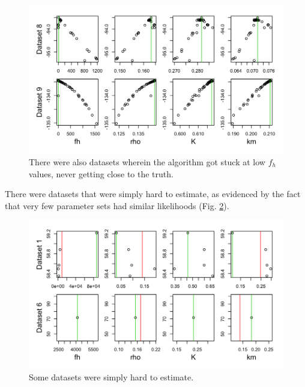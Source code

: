 \documentclass[12pt,reqno,final,pdftex]{amsart}\usepackage[]{graphicx}\usepackage[]{color}
\newenvironment{knitrout}{}{} %
\theoremstyle{plain}
\numberwithin{equation}{part}
\begin{document}
\begin{knitrout}\scriptsize
{}\color{fgcolor}\begin{figure}

\includegraphics[width=\linewidth]{figure/lik-against-ests-4-1} \hfill{}

\caption[There were also datasets wherein the algorithm got stuck at low ]{There were also datasets wherein the algorithm got stuck at low $f_h$ values, never getting close to the truth.}\label{fig:lik-against-ests-4}
\end{figure}


\end{knitrout}

There were datasets that were simply hard to estimate, as evidenced by the fact that very few parameter sets had similar likelihoods (Fig. \ref{fig:lik-against-ests-5}).

\begin{knitrout}\scriptsize
{}\color{fgcolor}\begin{figure}

\includegraphics[width=\linewidth]{figure/lik-against-ests-5-1} \hfill{}

\caption[Some datasets were simply hard to estimate]{Some datasets were simply hard to estimate.}\label{fig:lik-against-ests-5}
\end{figure}


\end{knitrout}
\end{document}
